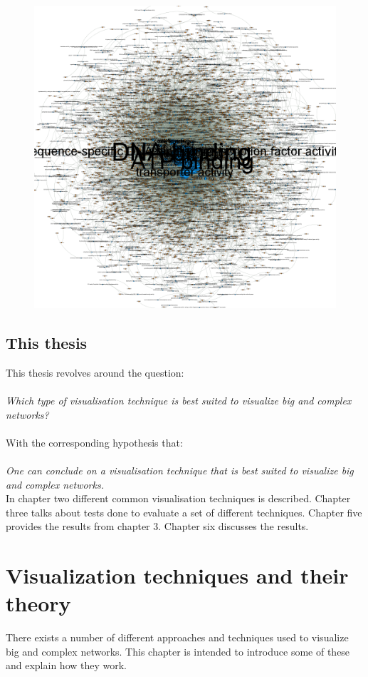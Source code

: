 \documentclass[a4paper,11pt]{kth-mag}
\begin{document}
\begin{figure}[!htbp]
	\centering
	\includegraphics[scale=0.4]{HairBallGraph}
	\caption{}
	\label{fig:hair_ball}
\end{figure}
\section{This thesis}
This thesis revolves around the question:\\
\\
\emph{Which type of visualisation technique is best suited to visualize big and complex networks?}\\
\\
With the corresponding hypothesis that:\\
\\
\emph{One can conclude on a visualisation technique that is best suited to visualize big and complex networks.}
\\

In chapter two different common visualisation techniques is described. Chapter three talks about tests done to evaluate a set of different techniques. Chapter five provides the results from chapter 3. Chapter six discusses
the results.
\chapter{Visualization techniques and their theory}
\label{chapter:one}
There exists a number of different approaches and techniques used to visualize big and complex networks. This chapter is intended to introduce some of these and explain how they work.
\end{document}
